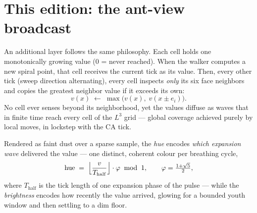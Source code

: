 \documentclass[11pt,a4paper]{article}
\begin{document}
\section{This edition: the ant-view broadcast}
An additional layer follows the same philosophy. Each cell holds one
monotonically growing value ($0$ = never reached). When the walker
computes a new spiral point, that cell receives the current tick as its
value. Then, every other tick (sweep direction alternating), every cell
inspects \emph{only} its six face neighbors and copies the greatest
neighbor value if it exceeds its own:
\begin{equation}
v(x) \;\leftarrow\; \max\big(v(x),\; v(x \pm e_i)\big).
\end{equation}
No cell ever senses beyond its neighborhood, yet the values diffuse as
waves that in finite time reach every cell of the $L^3$ grid --- global
coverage achieved purely by local moves, in lockstep with the CA tick.

Rendered as faint dust over a sparse sample, the \emph{hue} encodes
\emph{which expansion wave} delivered the value --- one distinct,
coherent colour per breathing cycle,
\begin{equation}
\mathrm{hue} \;=\; \Bigl\lfloor \frac{v}{T_{\mathrm{half}}} \Bigr\rfloor
\cdot \varphi \;\bmod\; 1,
\qquad \varphi = \tfrac{1+\sqrt5}{2},
\end{equation}
where $T_{\mathrm{half}}$ is the tick length of one expansion phase of
the pulse --- while the \emph{brightness} encodes how recently the value
arrived, glowing for a bounded youth window and then settling to a dim
floor.
\end{document}
